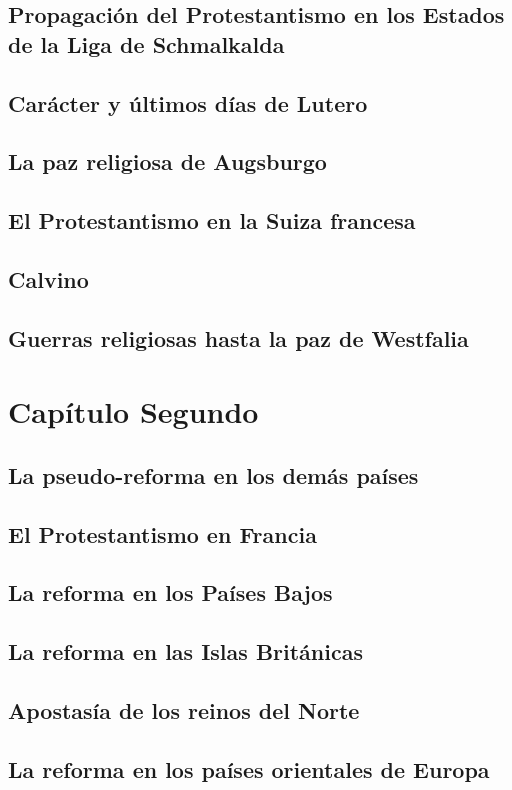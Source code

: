\raggedbottom{} \documentclass[12pt, a4paper]{book}
\begin{document}
\section{Propagación del Protestantismo en los Estados de la Liga de Schmalkalda}
\section{Carácter y últimos días de Lutero}
\section{La paz religiosa de Augsburgo}
\section{El Protestantismo en la Suiza francesa}
\section{Calvino}
\section{Guerras religiosas hasta la paz de Westfalia}
\chapter{Capítulo Segundo}
\section{La pseudo-reforma en los demás países}
\section{El Protestantismo en Francia}
\section{La reforma en los Países Bajos}
\section{La reforma en las Islas Británicas}
\section{Apostasía de los reinos del Norte}
\section{La reforma en los países orientales de Europa}
\end{document}
